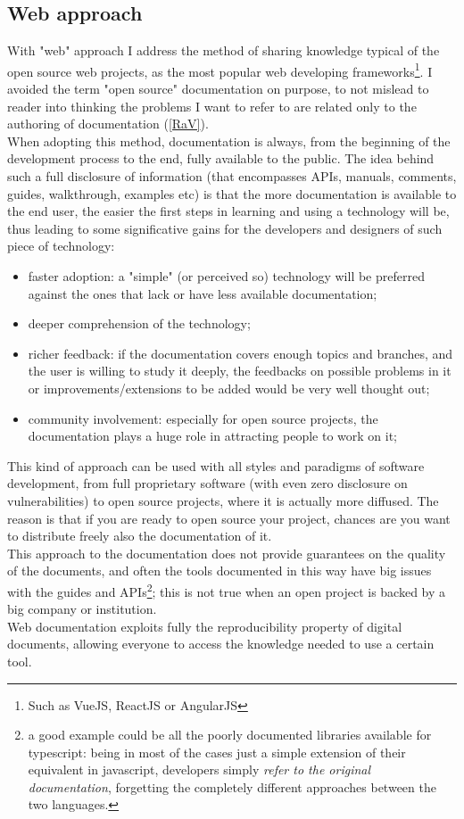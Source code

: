 \documentclass{article}
\begin{document}
		\subsection{Web approach}
			With "web" approach I address the method of sharing knowledge typical of the open source web projects, as the most popular web developing frameworks\footnote{Such as VueJS, ReactJS or AngularJS}. I avoided the term "open source" documentation on purpose, to not mislead to reader into thinking the problems I want to refer to are related only to the authoring of documentation (\ref{RaV}).\\
			When adopting this method, documentation is always, from the beginning of the development process to the end, fully	available to the public. The idea behind such a full disclosure of information (that encompasses APIs, manuals, comments, guides, walkthrough, examples etc) is that the more documentation is available to the end user, the easier the first steps in learning and using a technology will be, thus leading to some significative gains for the developers and designers of such piece of technology:
			\begin{itemize}
				\item faster adoption: a "simple" (or perceived so) technology will be preferred against the ones that lack or have less available documentation;
				\item deeper comprehension of the technology;
				\item richer feedback: if the documentation covers enough topics and branches, and the user is willing to study it deeply, the feedbacks on possible problems in it or improvements/extensions to be added would be very well thought out;
				\item community involvement: especially for open source projects, the documentation plays a huge role in attracting people to work on it;
			\end{itemize}
			This kind of approach can be used with all styles and paradigms of software development, from full proprietary software (with even zero disclosure on vulnerabilities) to open source projects, where it is actually more diffused. The reason is that if you are ready to open source your project, chances are you want to distribute freely also the documentation of it.\\
			This approach to the documentation does not provide guarantees on the quality of the documents, and often the tools documented in this way have big issues with the guides and APIs\footnote{a good example could be all the poorly documented libraries available for typescript: being in most of the cases just a simple extension of their equivalent in javascript, developers simply \textit{refer to the original documentation}, forgetting the completely different approaches between the two languages.}; this is not true when an open project is backed by a big company or institution.\\
			Web documentation exploits fully the reproducibility property of digital documents, allowing everyone to access the knowledge needed to use a certain tool.
\end{document}
